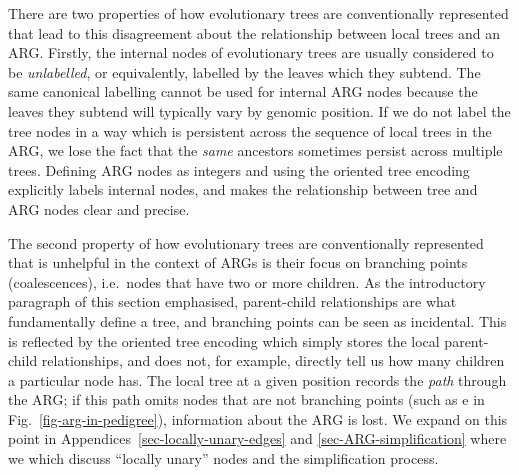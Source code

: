\documentclass[9pt,twocolumn,twoside]{gsajnl}
\newcommand{\noderef}[1]{\textsf{#1}}
\begin{document}
There are two properties of how evolutionary trees are conventionally
represented that lead to this
disagreement about the relationship between local trees and an ARG.
Firstly, the internal nodes of evolutionary trees are usually considered to be
\emph{unlabelled}, or equivalently, labelled by the leaves which they subtend.
The same canonical labelling cannot be used for internal ARG nodes because the
leaves they subtend will typically vary by genomic position. If we do not label
the tree nodes in a way which is persistent across the sequence of local trees
in the ARG, we lose the fact that the \emph{same} ancestors sometimes persist
across multiple trees.
Defining ARG nodes as integers and using the oriented
tree encoding explicitly labels internal nodes, and makes the relationship
between tree and ARG nodes clear and precise.

The second property of how evolutionary trees
are conventionally represented that is unhelpful in the context of ARGs is their
focus on branching points (coalescences), i.e.\ nodes that have two or more children.
As the introductory paragraph of this section emphasised,
parent-child relationships are what fundamentally define a tree,
and branching points can be seen as incidental. This is reflected
by the oriented tree encoding which simply stores the local
parent-child relationships, and does not, for example,
directly tell us how many children a particular node has.
The local tree at a given position records the \emph{path} through
the ARG; if this path omits nodes that are not
branching points (such as \noderef{e} in Fig.~\ref{fig-arg-in-pedigree}),
information about the ARG is lost.
We expand on this point in Appendices~\ref{sec-locally-unary-edges} and
\ref{sec-ARG-simplification}
where we which discuss ``locally unary'' nodes and the simplification process.
\end{document}
